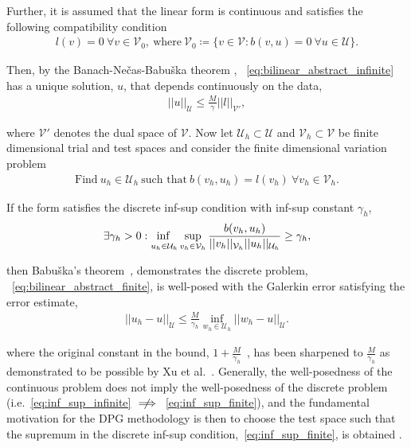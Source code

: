 Further, it is assumed that the linear form is continuous and satisfies the following compatibility condition
\begin{align}
l(v) = 0\ \forall v \in \mathcal{V}_0,\ \text{where}\ \mathcal{V}_0 \coloneqq \{v \in \mathcal{V} : b(v,u) = 0\ \forall u
\in \mathcal{U} \}.
\end{align}

Then, by the Banach-Ne\v{c}as-Babu\v{s}ka theorem , ~\eqref{eq:bilinear_abstract_infinite} has a unique solution, $u$, that depends continuously on the data,
\begin{align}
||u||_{\mathcal{U}} \le \frac{M}{\gamma} ||l||_{\mathcal{V}'},
\end{align}

where $\mathcal{V}'$ denotes the dual space of $\mathcal{V}$. Now let $\mathcal{U}_h \subset \mathcal{U}$ and $\mathcal{V}_h
\subset \mathcal{V}$ be finite dimensional trial and test spaces and consider the finite dimensional variation problem
\begin{align} \label{eq:bilinear_abstract_finite}
\text{Find}\ u_h \in \mathcal{U}_h\ \text{such that}\
b(v_h,u_h) = l(v_h)\ \forall v_h \in \mathcal{V}_h.
\end{align}

If the form satisfies the discrete inf-sup condition with inf-sup constant $\gamma_h$,
\begin{align} \label{eq:inf_sup_finite}
\exists \gamma_h > 0 :
\adjustlimits\inf_{u_h\in\mathcal{U}_h} \sup_{v_h\in\mathcal{V}_h}
\frac{b(v_h,u_h)}{||v_h||_{\mathcal{V}_h}||u_h||_{\mathcal{U}_h}} \ge \gamma_h,
\end{align}

then Babu\v{s}ka's theorem~\cite[Theorem ]{Babuska1971}, demonstrates the discrete problem,
~\eqref{eq:bilinear_abstract_finite}, is well-posed with the Galerkin error satisfying the error estimate,
\begin{align} \label{eq:abstract_dpg_error}
||u_h-u||_{\mathcal{U}} \le \frac{M}{\gamma_h} \inf_{w_h \in \mathcal{U}_h} ||w_h-u||_{\mathcal{U}}.
\end{align}

where the original constant in the bound, $1 + \frac{M}{\gamma_h}$~\cite[eq. ()]{Babuska1971}, has been
sharpened to $\frac{M}{\gamma_h}$ as demonstrated to be possible by Xu et al.~\cite[Theorem \makeblue{2}]{Xu2003}.
Generally, the well-posedness of the continuous problem does not imply the well-posedness of the discrete problem
(i.e.~\eqref{eq:inf_sup_infinite} $\centernot\implies$~\eqref{eq:inf_sup_finite}), and the fundamental motivation for
the DPG methodology is then to choose the test space such that the supremum in the discrete inf-sup
condition,~\eqref{eq:inf_sup_finite}, is obtained .

